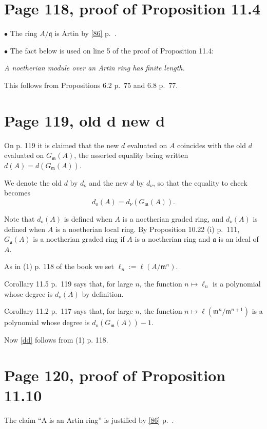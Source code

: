 \documentclass[12pt]{article}
\newcommand{\mf}{\mathfrak}
\newcommand{\bu}{\bullet}
\begin{document}
\section{Page 118, proof of Proposition 11.4}%

$\bu$ The ring $A/\mf q$ is Artin by \eqref{86} p.~\pageref{86}.

$\bu$ The fact below is used on line 5 of the proof of Proposition 11.4:

\emph{A noetherian module over an Artin ring has finite length.}

This follows from Propositions 6.2 p.~75 and 6.8 p.~77.

\section{Page 119, old d new d}\label{odnd}%

On p. 119 it is claimed that the new $d$ evaluated on $A$ coincides with the old $d$ evaluated on $G_{\mf m}(A)$, the asserted equality being written $d(A)=d(G_{\mf m}(A))$. 

We denote the old $d$ by $d_o$ and the new $d$ by $d_\nu$, so that the equality to check becomes 
\begin{equation}\label{dd}
d_o(A)=d_\nu(G_{\mf m}(A)).
\end{equation}

Note that $d_o(A)$ is defined when $A$ is a noetherian graded ring, and $d_\nu(A)$ is defined when $A$ is a noetherian local ring. By Proposition 10.22 (i) p.~111, $G_{\mf a}(A)$ is a noetherian graded ring if $A$ is a noetherian ring and $\mf a$ is an ideal of $A$.

As in (1) p. 118 of the book we set $\ell_n:=\ell(A/\mf m^n)$. 

Corollary 11.5 p.~119 says that, for large $n$, the function $n\mapsto\ell_n$ is a polynomial whose degree is $d_\nu(A)$ by definition. 

Corollary 11.2 p.~117 says that, for large $n$, the function $n\mapsto\ell(\mf m^n/\mf m^{n+1})$ is a polynomial whose degree is $d_o(G_{\mf m}(A))-1$.

Now \eqref{dd} follows from (1) p. 118.

\section{Page 120, proof of Proposition 11.10}%

The claim ``A is an Artin ring'' is justified by \eqref{86} p.~\pageref{86}.
\end{document}

